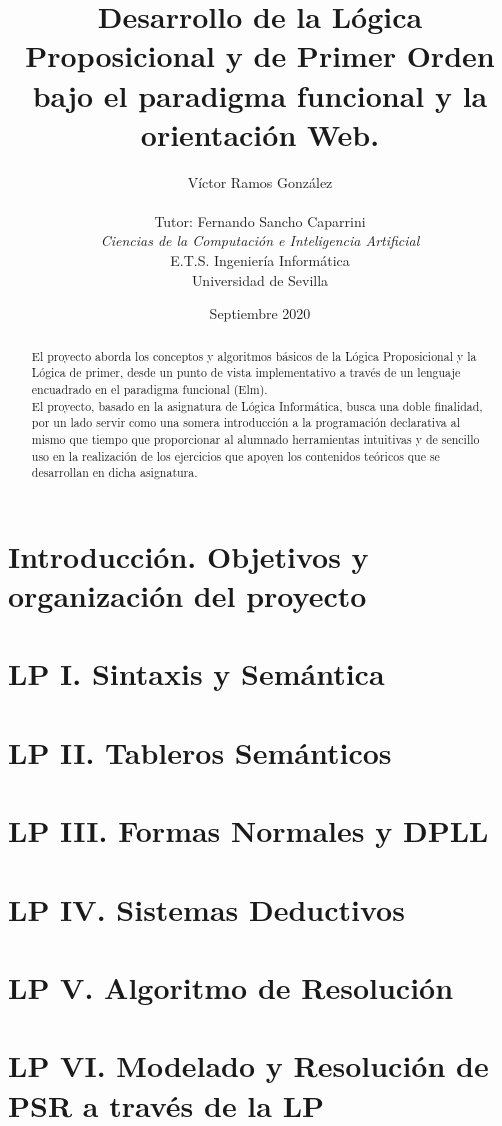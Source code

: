 \documentclass[a4paper]{report}
\title{Desarrollo de la Lógica Proposicional y de Primer Orden bajo el paradigma funcional y la orientación Web.}
\author{Víctor Ramos González\\\\
   Tutor: Fernando Sancho Caparrini\\
   \textit{Ciencias de la Computación e Inteligencia Artificial}\\
   E.T.S. Ingeniería Informática\\
   Universidad de Sevilla\\
  \vspace{8cm}
  \date{Septiembre 2020}
}
\def\blankpage{%
      \clearpage%
      \thispagestyle{empty}%
      \addtocounter{page}{0}%
      \null%
      \clearpage}
\begin{document}



\blankpage

\maketitle

\begin{abstract}

El proyecto aborda los conceptos y algoritmos básicos de la Lógica Proposicional y la Lógica de primer, desde un punto de vista implementativo a través de un lenguaje encuadrado en el paradigma funcional (Elm).\\

El proyecto, basado en la asignatura de Lógica Informática, busca una doble finalidad, por un lado servir como una somera introducción a la programación declarativa al mismo que tiempo que proporcionar al alumnado  herramientas intuitivas y de sencillo uso en la realización de los ejercicios que apoyen los contenidos teóricos que se desarrollan en dicha asignatura.\\
\end{abstract}

\tableofcontents

\newpage


\chapter{Introducción. Objetivos y organización del proyecto}
\chapter{LP I. Sintaxis y Semántica}
\chapter{LP II. Tableros Semánticos}
\chapter{LP III. Formas Normales y DPLL}
\chapter{LP IV. Sistemas Deductivos}
\chapter{LP V. Algoritmo de Resolución}
\chapter{LP VI. Modelado y Resolución de PSR a través de la LP}
\end{document}

